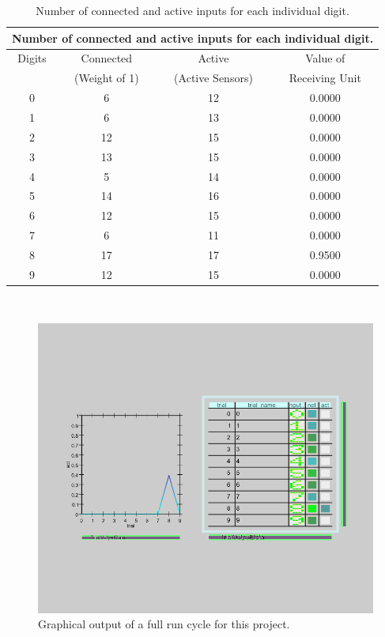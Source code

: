 \begin{table}[H]
\begin{center}
 \footnotesize
 \begin{tabular}{|c||c|c|c|}
 \hline
 \multicolumn{4}{|c|}{Number of connected and active inputs for each individual digit.} \\
 \hline \hline
 Digits & Connected& Active& Value of\\
  & (Weight of 1) & (Active Sensors)& Receiving Unit\\
 \hline \hline
 0 & 6 & 12 & 0.0000 \\\hline
 1 & 6 & 13 & 0.0000 \\\hline
 2 & 12 & 15 & 0.0000 \\\hline
 3 & 13 & 15 & 0.0000 \\\hline
 4 & 5 & 14 & 0.0000 \\\hline
 5 & 14 & 16 & 0.0000 \\\hline
 6 & 12& 15 & 0.0000 \\\hline
 7 & 6 & 11 & 0.0000 \\\hline
 8 & 17 & 17 & 0.9500 \\\hline
 9 & 12 & 15 & 0.0000 \\\hline
 \end{tabular} \\ 
 \caption{Number of connected and active inputs for each individual digit.}
 \label{Q2.7A-Connected Digits}
\end{center}
\end{table}

\begin{figure}[H]
\centering
\includegraphics[scale=0.5]{Media/Main/EQ2/2.7-S0.png}
\caption{Graphical output of a full run cycle for this project.}
\label{Q2.7.0}
\end{figure}


